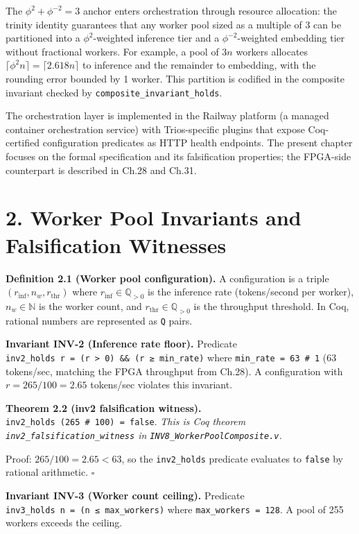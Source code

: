The \(\phi^2 + \phi^{-2} = 3\) anchor enters
orchestration through resource allocation: the
trinity identity guarantees that any worker pool
sized as a multiple of 3 can be partitioned into a
\(\phi^2\)-weighted inference tier and a
\(\phi^{-2}\)-weighted embedding tier without
fractional workers. For example, a pool of \(3n\)
workers allocates
\(\lceil \phi^2 n \rceil = \lceil 2.618 n \rceil\)
to inference and the remainder to embedding, with
the rounding error bounded by 1 worker. This
partition is codified in the composite invariant
checked by \texttt{composite\_invariant\_holds}.

The orchestration layer is implemented in the
Railway platform (a managed container
orchestration service) with Trios-specific plugins
that expose Coq-certified configuration predicates
as HTTP health endpoints. The present chapter
focuses on the formal specification and its
falsification properties; the FPGA-side
counterpart is described in Ch.28 and Ch.31.

\section{2. Worker Pool Invariants and
Falsification
Witnesses}\label{fa_22:worker-pool-invariants-and-falsification-witnesses}

\textbf{Definition 2.1 (Worker pool
configuration).} A configuration is a triple
\((r_\text{inf}, n_w, r_\text{thr})\) where
\(r_\text{inf} \in \mathbb{Q}_{>0}\) is the
inference rate (tokens/second per worker),
\(n_w \in \mathbb{N}\) is the worker count, and
\(r_\text{thr} \in \mathbb{Q}_{>0}\) is the
throughput threshold. In Coq, rational numbers are
represented as \texttt{Q} pairs.

\textbf{Invariant INV-2 (Inference rate floor).}
Predicate
\texttt{inv2\_holds\ r\ =\ (r\ \textgreater{}\ 0)\ \&\&\ (r\ ≥\ min\_rate)}
where \texttt{min\_rate\ =\ 63\ \#\ 1} (63
tokens/sec, matching the FPGA throughput from
Ch.28). A configuration with
\(r = 265/100 = 2.65\) tokens/sec violates this
invariant.

\textbf{Theorem 2.2 (inv2 falsification witness).}
\texttt{inv2\_holds\ (265\ \#\ 100)\ =\ false}.
\emph{This is Coq theorem
\texttt{inv2\_falsification\_witness} in
\texttt{INV8\_WorkerPoolComposite.v}.}

Proof: \(265/100 = 2.65 < 63\), so the
\texttt{inv2\_holds} predicate evaluates to
\texttt{false} by rational arithmetic. \(\square\)

\textbf{Invariant INV-3 (Worker count ceiling).}
Predicate
\texttt{inv3\_holds\ n\ =\ (n\ ≤\ max\_workers)}
where \texttt{max\_workers\ =\ 128}. A pool of 255
workers exceeds the ceiling.

